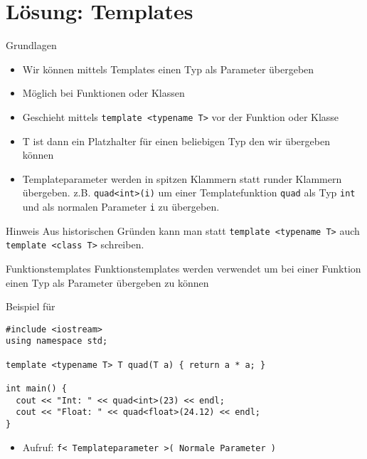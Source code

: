 \documentclass[presentation]{beamer}
\begin{document}
\section{Lösung: Templates}
\label{sec:orgb8048a7}
\begin{frame}[label={sec:orgeb7bdab},fragile]{Grundlagen}
 \begin{itemize}
\item Wir können mittels Templates \alert{einen Typ als Parameter} übergeben
\item Möglich bei \alert{Funktionen} oder \alert{Klassen}
\item Geschieht mittels {\color{solarizedYellow}\verb!template <typename T>!} vor der Funktion oder Klasse
\item T ist dann ein \alert{Platzhalter} für einen beliebigen Typ den wir übergeben können
\item Templateparameter werden in spitzen Klammern statt runder Klammern
übergeben. z.B. {\color{solarizedYellow}\verb!quad<int>(i)!} um einer Templatefunktion {\color{solarizedYellow}\verb!quad!} als
Typ {\color{solarizedYellow}\verb!int!} und als normalen Parameter {\color{solarizedYellow}\verb!i!} zu übergeben.
\end{itemize}
\begin{block}{Hinweis}
Aus historischen Gründen kann man statt {\color{solarizedYellow}\verb!template <typename T>!} auch
{\color{solarizedYellow}\verb!template <class T>!} schreiben.
\end{block}
\end{frame}
\begin{frame}[label={sec:orgdd2dfc0},fragile]{Funktionstemplates}
 Funktionstemplates werden verwendet um bei einer Funktion einen Typ
als Parameter übergeben zu können
\begin{exampleblock}{Beispiel für {\color{solarizedYellow}}}
\begin{verbatim}
#include <iostream>
using namespace std;

template <typename T> T quad(T a) { return a * a; }

int main() {
  cout << "Int: " << quad<int>(23) << endl;
  cout << "Float: " << quad<float>(24.12) << endl;
}
\end{verbatim}
\end{exampleblock}
\begin{itemize}
\item Aufruf: {\color{solarizedYellow}\verb!f< Templateparameter >( Normale Parameter )!}
\end{itemize}
\end{frame}
\end{document}

